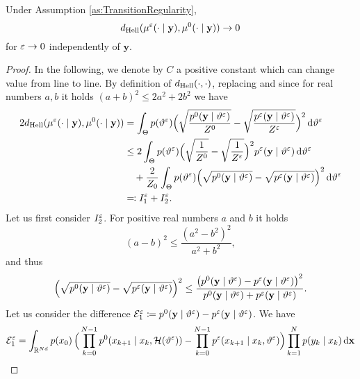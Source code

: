 \documentclass[10pt]{article}
\begin{document}
\begin{theorem} Under Assumption \ref{as:TransitionRegularity},
	\begin{equation}
		d_{\mathrm{Hell}}(\mu^\varepsilon(\cdot \mid \mathbf y), \mu^0(\cdot \mid \mathbf y)) \to 0
	\end{equation}
	for $\varepsilon \to 0$ independently of $\mathbf y$.	
\end{theorem}
\begin{proof}
	In the following, we denote by $C$ a positive constant which can change value from line to line. By definition of $d_{\mathrm{Hell}}(\cdot, \cdot)$, replacing and since for real numbers $a,b$ it holds $(a+b)^2 \leq 2a^2 + 2b^2$ we have
	\begin{equation}
	\begin{aligned}
		2d_{\mathrm{Hell}}(\mu^\varepsilon(\cdot \mid \mathbf y), \mu^0(\cdot \mid \mathbf y)) &= \int_{\Theta} p(\vartheta^\varepsilon) \Big(\sqrt{\frac{p^0(\mathbf y \mid \vartheta^\varepsilon)}{Z^0}} - \sqrt{\frac{p^\varepsilon(\mathbf y \mid \vartheta^\varepsilon)}{Z^\varepsilon}}\Big)^2 \,\mathrm{d} \vartheta^\varepsilon\\
		&\leq 2\int_{\Theta} p(\vartheta^\varepsilon) \Big(\sqrt{\frac{1}{Z^0}} - \sqrt{\frac{1}{Z^\varepsilon}}\Big)^2p^\varepsilon(\mathbf y \mid \vartheta^\varepsilon) \,\mathrm{d} \vartheta^\varepsilon\\
		&\quad + \frac{2}{Z_0} \int_{\Theta} p(\vartheta^\varepsilon)\Big(\sqrt{p^0(\mathbf y \mid \vartheta^\varepsilon)} - \sqrt{p^\varepsilon(\mathbf y \mid \vartheta^\varepsilon)}\Big)^2 \,\mathrm{d} \vartheta^\varepsilon \\
		&\eqqcolon I_1^\varepsilon + I_2^\varepsilon.
	\end{aligned}
	\end{equation}
	Let us first consider $I_2^\varepsilon$. For positive real numbers $a$ and $b$ it holds
	\begin{equation}
		(a -b)^2 \leq \frac{(a^2 - b^2)^2}{a^2 + b^2},
	\end{equation}
	and thus
	\begin{equation}
		\Big(\sqrt{p^0(\mathbf y \mid \vartheta^\varepsilon)} - \sqrt{p^\varepsilon(\mathbf y \mid \vartheta^\varepsilon)}\Big)^2 \leq \frac{\big(p^0(\mathbf y \mid \vartheta^\varepsilon) - p^\varepsilon(\mathbf y \mid \vartheta^\varepsilon)\big)^2}{p^0(\mathbf y \mid \vartheta^\varepsilon) + p^\varepsilon(\mathbf y \mid \vartheta^\varepsilon)}.
	\end{equation}
	Let us consider the difference $\mathcal E_1^\varepsilon \coloneqq p^0(\mathbf y \mid \vartheta^\varepsilon) - p^\varepsilon(\mathbf y \mid \vartheta^\varepsilon)$. We have
	\begin{equation}\label{eq:HellProofE1}
	\begin{aligned}
		\mathcal E_1^\epl &= \int_{\R^{Nd}} p(x_0) \, \Big(\prod_{k=0}^{N-1} p^0(x_{k+1}\mid x_k, \mathcal H(\theta^\epl)) - \prod_{k=0}^{N-1} p^\epl(x_{k+1}\mid x_k, \theta^\epl)\Big) \prod_{k=1}^{N} p(y_k \mid x_k) \dd \mathbf x \\

\end{aligned}
\end{equation}
\end{proof}
\end{document}
